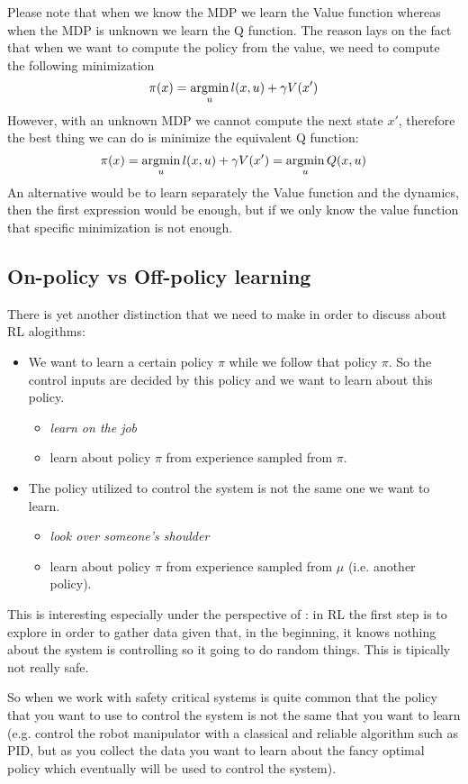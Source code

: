 Please note that when we know the MDP we learn the Value function whereas when the MDP is unknown we learn the Q function.
The reason lays on the fact that when we want to compute the policy from the value, we need to compute the following minimization
\[\pi(x) = \operatorname*{argmin}_u l(x,u) + \gamma V(x')\]
However, with an unknown MDP we cannot compute the next state $x'$, therefore the best thing we can do is minimize the equivalent Q function:
\[\pi(x) = \operatorname*{argmin}_u l(x,u) + \gamma V(x') =\operatorname*{argmin}_u Q(x,u)\]
An alternative would be to learn separately the Value function and the dynamics, then the first expression would be enough, but if we only know the value function that specific minimization is not enough.

\subsection{On-policy vs Off-policy learning}
There is yet another distinction that we need to make in order to discuss about RL alogithms:
\begin{itemize}
\item {}

We want to learn a certain policy $\pi$ while we follow that policy $\pi$. So the control inputs are decided by this policy and we want to learn about this policy.
\begin{itemize}
\item \emph{learn on the job}
\item learn about policy $\pi$ from experience sampled from $\pi$.
\end{itemize}
\item {}

The policy utilized to control the system is not the same one we want to learn.
\begin{itemize}
\item \emph{look over someone's shoulder}
\item learn about policy $\pi$ from experience sampled from $\mu$ (i.e. another policy).
\end{itemize}
\end{itemize}

This is interesting especially under the perspective of : in RL the first step is to explore in order to gather data given that, in the beginning, it knows nothing about the system is controlling so it going to do random things. This is tipically not really safe. 

So when we work with safety critical systems is quite common that the policy that you want to use to control the system is not the same that you want to learn (e.g. control the robot manipulator with a classical and reliable algorithm such as PID, but as you collect the data you want to learn about the fancy optimal policy which eventually will be used to control the system).

